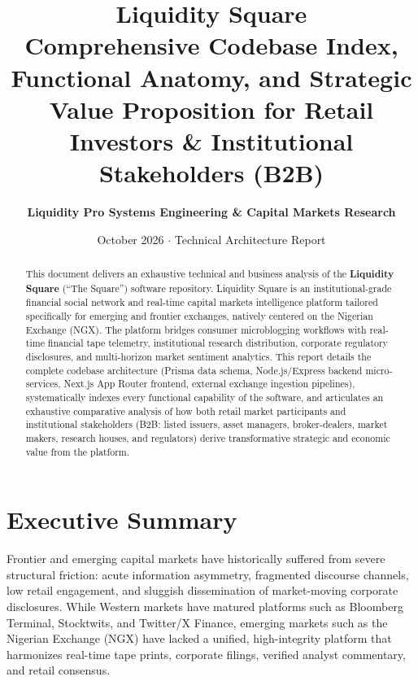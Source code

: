 \documentclass[11pt,a4paper]{article}
\title{
    \vspace{-1.5cm}
    \textbf{\Huge\sffamily Liquidity Square}\\
    \vspace{0.4cm}
    \Large\sffamily Comprehensive Codebase Index, Functional Anatomy, and Strategic Value Proposition for Retail Investors \& Institutional Stakeholders (B2B)
}
\author{\textbf{Liquidity Pro Systems Engineering \& Capital Markets Research}}
\date{October 2026 $\cdot$ Technical Architecture Report}
\begin{document}
\maketitle

\begin{abstract}
\noindent This document delivers an exhaustive technical and business analysis of the \textbf{Liquidity Square} (``The Square'') software repository. Liquidity Square is an institutional-grade financial social network and real-time capital markets intelligence platform tailored specifically for emerging and frontier exchanges, natively centered on the Nigerian Exchange (NGX). The platform bridges consumer microblogging workflows with real-time financial tape telemetry, institutional research distribution, corporate regulatory disclosures, and multi-horizon market sentiment analytics. This report details the complete codebase architecture (Prisma data schema, Node.js/Express backend micro-services, Next.js App Router frontend, external exchange ingestion pipelines), systematically indexes every functional capability of the software, and articulates an exhaustive comparative analysis of how both retail market participants and institutional stakeholders (B2B: listed issuers, asset managers, broker-dealers, market makers, research houses, and regulators) derive transformative strategic and economic value from the platform.
\end{abstract}

\vspace{0.5cm}
\tableofcontents
\newpage

\section{Executive Summary}

Frontier and emerging capital markets have historically suffered from severe structural friction: acute information asymmetry, fragmented discourse channels, low retail engagement, and sluggish dissemination of market-moving corporate disclosures. While Western markets have matured platforms such as Bloomberg Terminal, Stocktwits, and Twitter/X Finance, emerging markets such as the Nigerian Exchange (NGX) have lacked a unified, high-integrity platform that harmonizes real-time tape prints, corporate filings, verified analyst commentary, and retail consensus.
\end{document}
